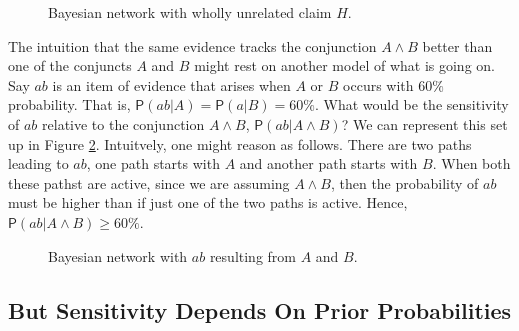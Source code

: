 \documentclass[10pt,dvipsnames,enabledeprecatedfontcommands]{scrartcl}
\newcommand{\pr}[1]{\mathsf{P}(#1)}
\begin{document}
\begin{center}
\begin{figure}[h!]

\caption{Bayesian network with wholly unrelated claim $H$.}
\label{network-unrelated}
\end{figure}
\end{center}

The intuition that the same evidence tracks the conjunction
\(A\wedge B\) better than one of the conjuncts \(A\) and \(B\) might
rest on another model of what is going on. Say \(ab\) is an item of
evidence that arises when \(A\) or \(B\) occurs with \(60\%\)
probability. That is, \(\pr{ab \vert A}=\pr{a \vert B}=60\%\). What
would be the sensitivity of \(ab\) relative to the conjunction
\(A\wedge B\), \(\pr{ab \vert A\wedge B}\)? We can represent this set up
in Figure \ref{network-ab}. Intuitvely, one might reason as follows.
There are two paths leading to \(ab\), one path starts with \(A\) and
another path starts with \(B\). When both these pathst are active, since
we are assuming \(A\wedge B\), then the probability of \(ab\) must be
higher than if just one of the two paths is active. Hence,
\(\pr{ab \vert A\wedge B}\geq 60\%\).

\begin{center}
\begin{figure}[h!]

\caption{Bayesian network with $ab$ resulting from $A$ and $B$.}
\label{network-ab}
\end{figure}
\end{center}

\subsection{But Sensitivity Depends On Prior
Probabilities}\label{but-sensitivity-depends-on-prior-probabilities}
\end{document}
